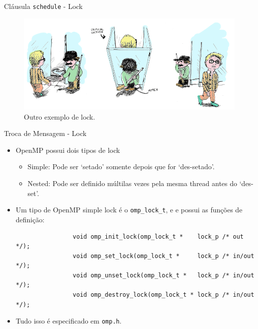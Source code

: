 	\begin{frame}{Cláusula {\tt schedule} - Lock}
		\begin{figure}[p]
			\centering
			\includegraphics[width=1\textwidth]{img/pacheco/mutex2.png}
			\caption{Outro exemplo de lock.}
		\end{figure}
	\end{frame}

	\begin{frame}[fragile]{Troca de Mensagem -  Lock}
		\begin{itemize}
			\item OpenMP possui dois tipos de lock
			\begin{itemize}
				\item Simple: Pode ser `setado' somente depois que for `des-setado'.
				\item Nested: Pode ser definido múltilas vezes pela mesma thread antes do `des-set'.
			\end{itemize}
			\item Um tipo de OpenMP simple lock é o {\tt omp\_lock\_t}, e e possui as funções de definição:
			\begin{verbatim}
				void omp_init_lock(omp_lock_t *    lock_p /* out */);
				void omp_set_lock(omp_lock_t *     lock_p /* in/out */); 
				void omp_unset_lock(omp_lock_t *   lock_p /* in/out */);  
				void omp_destroy_lock(omp_lock_t * lock_p /* in/out */);    
			\end{verbatim}
			\item Tudo isso é especificado em {\tt omp.h}.
		\end{itemize}
\end{frame}


